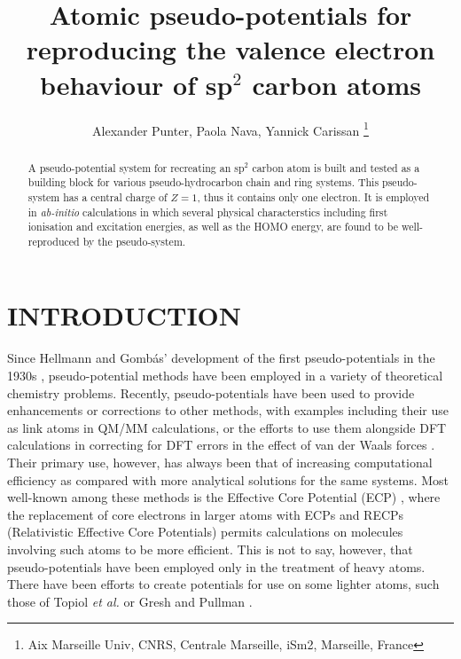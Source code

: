 \documentclass[12pt]{article}
\title{Atomic pseudo-potentials for reproducing the valence electron behaviour of sp$^2$ carbon atoms}
\author{Alexander Punter, Paola Nava, Yannick Carissan \thanks{Aix Marseille Univ, CNRS, Centrale Marseille, iSm2, Marseille, France}}
\begin{document}
\maketitle


\begin{abstract}
A pseudo-potential system for recreating an sp\(^{2}\) carbon atom is built and tested as a building block for various pseudo-hydrocarbon chain and ring systems.  
This pseudo-system has a central charge of $Z=1$, thus it contains only one electron. It is employed in \textsl{ab-initio} calculations in which several physical characterstics including first ionisation and excitation energies, as well as the HOMO energy, are found to be well-reproduced by the pseudo-system.
\end{abstract}

\clearpage

  \makeatletter
  \renewcommand\@biblabel[1]{#1.}
  \makeatother



\renewcommand{\baselinestretch}{1.5}
\normalsize


\clearpage

\section*{\sffamily \Large INTRODUCTION}

Since Hellmann and Gomb\'as' development of the first pseudo-potentials in the 1930s \cite{hellmann_1935, gombas_1935}, pseudo-potential methods have been employed in a variety of theoretical chemistry problems. Recently, pseudo-potentials have been used to provide enhancements or corrections to other methods, with examples including their use as link atoms in QM/MM calculations, or the efforts to use them alongside DFT calculations in correcting for DFT errors in the effect of van der Waals forces \cite{dilabio_2008}. Their primary use, however, has always been that of increasing computational efficiency as compared with more analytical solutions for the same systems. Most well-known among these methods is the Effective Core Potential (ECP) \cite{dolg_2000}, where the replacement of core electrons in larger atoms with ECPs and RECPs (Relativistic Effective Core Potentials) permits calculations on molecules involving such atoms to be more efficient. This is not to say, however, that pseudo-potentials have been employed only in the treatment of heavy atoms. There have been efforts to create potentials for use on some lighter atoms, such those of Topiol \emph{et al.} or Gresh and Pullman \cite{topiol_1976, gresh_1978}. 
\end{document}
